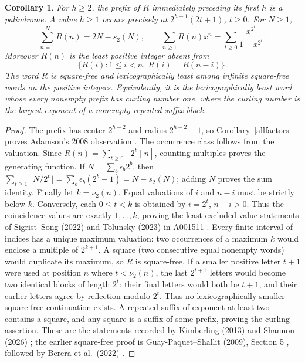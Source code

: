 \documentclass[11pt]{article}
\newtheorem{corollary}[theorem]{Corollary}
\newcommand{\vv}{\nu_2}
\begin{document}
\begin{corollary}\label{rulersiblings}
For $h\ge2$, the prefix of $R$ immediately preceding its first $h$
is a palindrome. A value $h\ge1$ occurs precisely at
$2^{h-1}(2t+1)$, $t\ge0$. For $N\ge1$,
\[
 \sum_{n=1}^N R(n)=2N-s_2(N),\qquad
 \sum_{n\ge1}R(n)x^n=\sum_{t\ge0}\frac{x^{2^t}}{1-x^{2^t}}.
\]
Moreover $R(n)$ is the least positive integer absent from
\[
 \{R(i):1\le i<n,\ R(i)=R(n-i)\}.
\]
The word $R$ is square-free and lexicographically least among infinite
square-free words on the positive integers. Equivalently, it is the
lexicographically least word whose every nonempty prefix has curling
number one, where the curling number is the largest exponent of a
nonempty repeated suffix block.
\end{corollary}
\begin{proof}
The prefix has center $2^{h-2}$ and radius $2^{h-2}-1$, so
Corollary~\ref{allfactors} proves Adamson's 2008 observation
\cite{oeisR}. The occurrence class follows from the valuation.
Since $R(n)=\sum_{t\ge0}[2^t\mid n]$, counting multiples proves
the generating function. If $N=\sum_b\epsilon_b2^b$, then
$\sum_{t\ge1}\lfloor N/2^t\rfloor=\sum_b\epsilon_b(2^b-1)
=N-s_2(N)$; adding $N$ proves the sum identity.
Finally let $k=\vv(n)$. Equal valuations of $i$ and $n-i$ must
be strictly below $k$. Conversely, each $0\le t<k$ is obtained by
$i=2^t$, $n-i>0$. Thus the coincidence values are exactly
$1,\ldots,k$, proving the least-excluded-value statements of
Sigrist--Song (2022) and Tolunsky (2023) in A001511 \cite{oeisR}.
Every finite interval of indices has a unique maximum valuation:
two occurrences of a maximum $k$ would enclose a multiple of $2^{k+1}$.
A square (two consecutive equal nonempty words) would duplicate its
maximum, so $R$ is square-free. If a smaller positive letter $t+1$
were used at position $n$ where $t<\vv(n)$, the last $2^{t+1}$
letters would become two identical blocks of length $2^t$:
their final letters would both be $t+1$, and their earlier letters
agree by reflection modulo $2^t$. Thus no lexicographically smaller
square-free continuation exists. A repeated suffix of exponent at
least two contains a square, and any square is a suffix of some prefix,
proving the curling assertion. These are the statements recorded by
Kimberling (2013) and Shannon (2026) \cite{oeisR}; the earlier
square-free proof is Guay-Paquet--Shallit (2009), Section 5
\cite{guayShallit}, followed by Berera et al.\ (2022)
\cite{squarefree}.
\end{proof}
\end{document}

